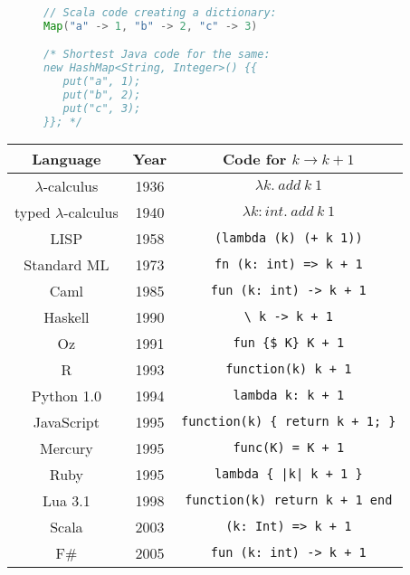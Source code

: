 \begin{wrapfigure}{l}{0.38\columnwidth}%
\vspace{-0.7\baselineskip}
\begin{lstlisting}[language=Java]
// Scala code creating a dictionary:
Map("a" -> 1, "b" -> 2, "c" -> 3)

/* Shortest Java code for the same:
new HashMap<String, Integer>() {{
   put("a", 1);
   put("b", 2);
   put("c", 3);
}}; */
\end{lstlisting}

\vspace{0\baselineskip}
\end{wrapfigure}%
\begin{wraptable}{r}{0.6\columnwidth}%
\begin{centering}
\vspace{-8\baselineskip}
\begin{tabular}{|c|c|c|}
\hline 
\textbf{Language} & \textbf{Year} & \textbf{Code for }$k\rightarrow k+1$\tabularnewline
\hline 
\hline 
{\footnotesize{}$\lambda$-calculus} & {\footnotesize{}1936} & $\lambda k.~add~k~1$\tabularnewline
\hline 
{\footnotesize{}typed $\lambda$-calculus} & {\footnotesize{}1940} & $\lambda k:int.~add~k~1$\tabularnewline
\hline 
{\footnotesize{}LISP} & {\footnotesize{}1958} & \texttt{\footnotesize{}}\lstinline!(lambda (k) (+ k 1))!\tabularnewline
\hline 
{\footnotesize{}Standard ML} & {\footnotesize{}1973} & \texttt{\footnotesize{}}\lstinline!fn (k: int) => k + 1!\tabularnewline
\hline 
{\footnotesize{}Caml} & {\footnotesize{}1985} & \lstinline!fun (k: int) -> k + 1!\tabularnewline
\hline 
{\footnotesize{}Haskell} & {\footnotesize{}1990} & \lstinline!\ k -> k + 1!\tabularnewline
\hline 
{\footnotesize{}Oz} & {\footnotesize{}1991} & \lstinline!fun {$ K} K + 1!\tabularnewline
\hline 
{\footnotesize{}R} & {\footnotesize{}1993} & \lstinline!function(k) k + 1!\tabularnewline
\hline 
{\footnotesize{}Python 1.0} & {\footnotesize{}1994} & \lstinline!lambda k: k + 1!\tabularnewline
\hline 
{\footnotesize{}JavaScript} & {\footnotesize{}1995} & \lstinline!function(k) { return k + 1; }!\tabularnewline
\hline 
{\footnotesize{}Mercury} & {\footnotesize{}1995} & \lstinline!func(K) = K + 1!\tabularnewline
\hline 
{\footnotesize{}Ruby} & {\footnotesize{}1995} & \lstinline!lambda { |k| k + 1 }!\tabularnewline
\hline 
{\footnotesize{}Lua 3.1} & {\footnotesize{}1998} & \lstinline!function(k) return k + 1 end!\tabularnewline
\hline 
{\footnotesize{}Scala} & {\footnotesize{}2003} & \lstinline!(k: Int) => k + 1!\tabularnewline
\hline 
{\footnotesize{}F\#} & {\footnotesize{}2005} & \lstinline!fun (k: int) -> k + 1!\tabularnewline

\end{tabular}
\end{centering}
\end{wraptable}
